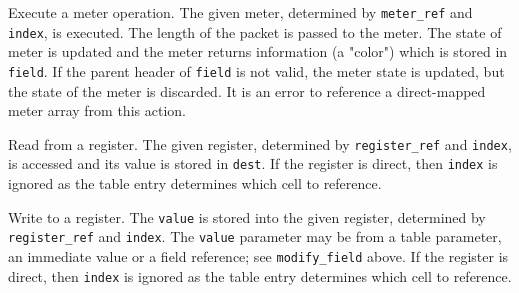 \documentclass[12pt]{article}
\begin{document}

{ %
Execute a meter operation.
}
{ %
}
{ %
The given meter, determined by \texttt{meter_ref} and \texttt{index}, is executed.
The length of the packet is passed to the meter. The state
of meter is updated and the meter returns information (a "color") which is
stored in \texttt{field}. If the parent header of \texttt{field} is not valid, the meter
state is updated, but the state of the meter is discarded.
It is an error to reference a direct-mapped meter array from this action.
}


{ %
Read from a register.
}
{ %
}
{ %
The given register, determined by \texttt{register_ref} and \texttt{index}, is accessed and its value is stored in \texttt{dest}. If the register is direct, then \texttt{index} is ignored as the table entry determines which
cell to reference.
}


{ %
Write to a register.
}
{ %
}
{ %
The \texttt{value} is stored into the given register, determined by \texttt{register_ref} and \texttt{index}.
The \texttt{value} parameter
may be from a table parameter, an immediate value or a field reference; see \texttt{modify_field} above.
If the register is direct, then \texttt{index} is ignored as the table entry determines which
cell to reference.
}
\end{document}
